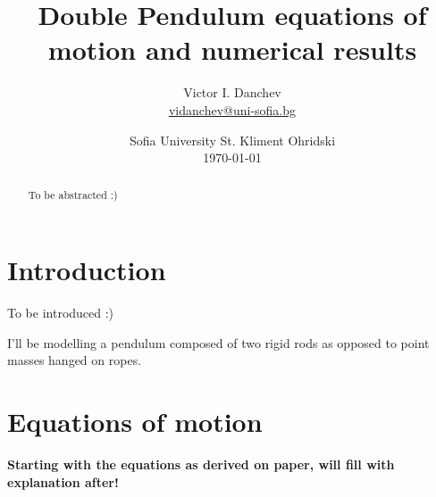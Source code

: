 \documentclass[a4paper]{article}
\title{Double Pendulum equations of motion and numerical results}
\author{Victor I.  Danchev \\ \href{vidanchev@uni-sofia.bg}{vidanchev@uni-sofia.bg}}
\date{
	Sofia University St.  Kliment Ohridski \\ 
	\today
}
\begin{document}
	\maketitle
	
	\begin{abstract}
	To be abstracted :)
	\end{abstract}

	\tableofcontents

	\newpage
	
	\section{Introduction} \label{Intro}
	To be introduced :)

	I'll be modelling a pendulum composed of two rigid rods as opposed to point masses hanged on ropes.

	\section{Equations of motion}\label{EoM}
	\textbf{Starting with the equations as derived on paper, will fill with explanation after!}
	
\end{document}
